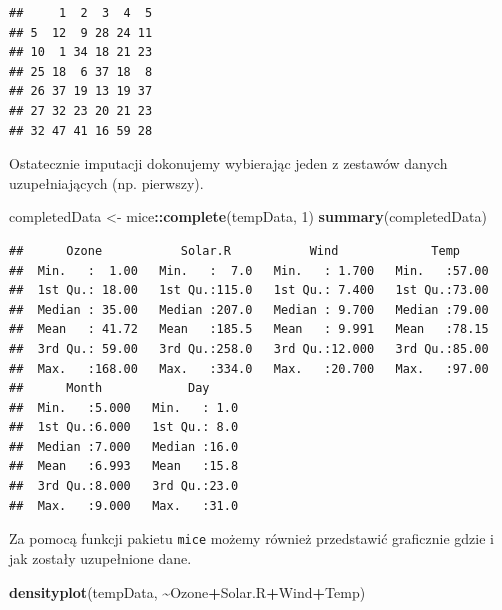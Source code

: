 \documentclass[
]{book}
\newenvironment{Shaded}{\begin{snugshade}}{\end{snugshade}}
\newcommand{\DecValTok}[1]{\textcolor[rgb]{0.00,0.00,0.81}{#1}}
\newcommand{\FunctionTok}[1]{\textcolor[rgb]{0.13,0.29,0.53}{\textbf{#1}}}
\newcommand{\NormalTok}[1]{#1}
\newcommand{\OtherTok}[1]{\textcolor[rgb]{0.56,0.35,0.01}{#1}}
\newcommand{\SpecialCharTok}[1]{\textcolor[rgb]{0.81,0.36,0.00}{\textbf{#1}}}
\theoremstyle{plain}
\theoremstyle{definition}
\theoremstyle{definition}
\theoremstyle{definition}
\theoremstyle{definition}
\theoremstyle{definition}
\theoremstyle{remark}
\begin{document}
\begin{Shaded}
\end{Shaded}

\begin{verbatim}
##     1  2  3  4  5
## 5  12  9 28 24 11
## 10  1 34 18 21 23
## 25 18  6 37 18  8
## 26 37 19 13 19 37
## 27 32 23 20 21 23
## 32 47 41 16 59 28
\end{verbatim}

Ostatecznie imputacji dokonujemy wybierając jeden z zestawów danych uzupełniających (np. pierwszy).

\begin{Shaded}
\begin{Highlighting}[]
\NormalTok{completedData }\OtherTok{\textless{}{-}}\NormalTok{ mice}\SpecialCharTok{::}\FunctionTok{complete}\NormalTok{(tempData, }\DecValTok{1}\NormalTok{)}
\FunctionTok{summary}\NormalTok{(completedData)}
\end{Highlighting}
\end{Shaded}

\begin{verbatim}
##      Ozone           Solar.R           Wind             Temp      
##  Min.   :  1.00   Min.   :  7.0   Min.   : 1.700   Min.   :57.00  
##  1st Qu.: 18.00   1st Qu.:115.0   1st Qu.: 7.400   1st Qu.:73.00  
##  Median : 35.00   Median :207.0   Median : 9.700   Median :79.00  
##  Mean   : 41.72   Mean   :185.5   Mean   : 9.991   Mean   :78.15  
##  3rd Qu.: 59.00   3rd Qu.:258.0   3rd Qu.:12.000   3rd Qu.:85.00  
##  Max.   :168.00   Max.   :334.0   Max.   :20.700   Max.   :97.00  
##      Month            Day      
##  Min.   :5.000   Min.   : 1.0  
##  1st Qu.:6.000   1st Qu.: 8.0  
##  Median :7.000   Median :16.0  
##  Mean   :6.993   Mean   :15.8  
##  3rd Qu.:8.000   3rd Qu.:23.0  
##  Max.   :9.000   Max.   :31.0
\end{verbatim}

Za pomocą funkcji pakietu \texttt{mice} możemy również przedstawić graficznie gdzie i jak zostały uzupełnione dane.

\begin{Shaded}
\begin{Highlighting}[]
\FunctionTok{densityplot}\NormalTok{(tempData, }\SpecialCharTok{\textasciitilde{}}\NormalTok{Ozone}\SpecialCharTok{+}\NormalTok{Solar.R}\SpecialCharTok{+}\NormalTok{Wind}\SpecialCharTok{+}\NormalTok{Temp)}
\end{Highlighting}
\end{Shaded}
\end{document}
